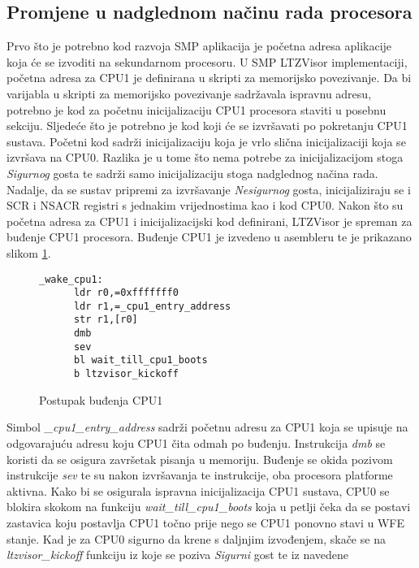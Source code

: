 \documentclass[times, utf8, diplomski, numeric]{fer}
\begin{document}
\subsection{Promjene u nadglednom načinu rada procesora}
Prvo što je potrebno kod razvoja SMP aplikacija je početna adresa aplikacije koja će se izvoditi na sekundarnom procesoru.
U SMP LTZVisor implementaciji, početna adresa za CPU1 je definirana u skripti za memorijsko povezivanje. Da bi varijabla u
skripti za memorijsko povezivanje sadržavala ispravnu adresu, potrebno je kod za početnu inicijalizaciju CPU1 procesora staviti
u posebnu sekciju. Sljedeće što je potrebno je kod koji će se izvršavati po pokretanju CPU1 sustava. Početni kod sadrži
inicijalizaciju koja je vrlo slična inicijalizaciji koja se izvršava na CPU0. Razlika je u tome što nema potrebe za
inicijalizacijom stoga \textit{Sigurnog} gosta te sadrži samo inicijalizaciju stoga nadglednog načina rada. Nadalje, da se
sustav pripremi za izvršavanje \textit{Nesigurnog} gosta, inicijaliziraju se i SCR i NSACR registri s jednakim vrijednostima
kao i kod CPU0. Nakon što su početna adresa za CPU1 i inicijalizacijski kod definirani, LTZVisor je spreman za buđenje CPU1
procesora. Buđenje CPU1 je izvedeno u asembleru te je prikazano slikom \ref{wake_cpu1}.
\begin{figure}[H]
  \centering
  \lstset{numbers=left, numbersep=2pt, numberstyle=\tiny, breaklines=true, xleftmargin=.2\textwidth}
  \begin{lstlisting}[firstnumber=1]
    _wake_cpu1:
      ldr r0,=0xfffffff0
      ldr r1,=_cpu1_entry_address
      str r1,[r0]
      dmb
      sev
      bl wait_till_cpu1_boots
      b ltzvisor_kickoff
  \end{lstlisting}
  \caption{Postupak buđenja CPU1}
  \label{wake_cpu1}
\end{figure}
Simbol \textit{\_cpu1\_entry\_address} sadrži početnu adresu za CPU1 koja se upisuje na odgovarajuću adresu koju CPU1 čita
odmah po buđenju. Instrukcija \textit{dmb} se koristi da se osigura završetak pisanja u memoriju. Buđenje se okida pozivom
instrukcije \textit{sev} te su nakon izvršavanja te instrukcije, oba procesora platforme aktivna. Kako bi se osigurala ispravna
inicijalizacija CPU1 sustava, CPU0 se blokira skokom na funkciju \textit{wait\_till\_cpu1\_boots} koja u petlji čeka da se
postavi zastavica koju postavlja CPU1 točno prije nego se CPU1 ponovno stavi u WFE stanje. Kad je za CPU0 sigurno da krene
s daljnjim izvođenjem, skače se na \textit{ltzvisor\_kickoff} funkciju iz koje se poziva \textit{Sigurni} gost te iz navedene
\end{document}
